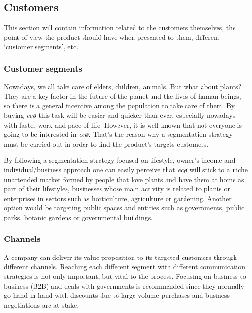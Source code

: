 \documentclass[english,runningheads,a4paper]{llncs}[2018/03/10]
\begin{document}

    \subsection*{Customers}

    This section will contain information related to the customers themselves,
    the point of view the product should have when presented to them, different
    `customer segments', etc.


        \subsubsection*{Customer segments}

        Nowadays, we all take care of elders, children, animals\ldots But what
        about plants? They are a key factor in the future of the planet and the
        lives of human beings, so there is a general incentive among the
        population to take care of them. By buying \textit{ec\textbf{\o}} this
        task will be easier and quicker than ever, especially nowadays with
        faster work and pace of life. However, it is well-known that not
        everyone is going to be interested in \textit{ec\textbf{\o}}. That's the
        reason why a segmentation strategy must be carried out in order to find
        the product's targets customers.

        By following a segmentation strategy focused on lifestyle, owner's
        income and individual/business approach one can easily perceive that
        \textit{ec\textbf{\o}} will stick to a niche unattended market formed by
        people that love plants and have them at home as part of their
        lifestyles, businesses whose main activity is related to plants or
        enterprises in sectors such as horticulture, agriculture or gardening.
        Another option would be targeting public spaces and entities such as
        governments, public parks, botanic gardens or governmental buildings.


        \subsubsection*{Channels}

        A company can deliver its value proposition to its targeted customers
        through different channels. Reaching each different segment with
        different communication strategies is not only important, but vital to
        the process. Focusing on business-to-business (B2B) and deals with
        governments is recommended since they normally go hand-in-hand with
        discounts due to large volume purchases and business negotiations are at
        stake.
\end{document}
